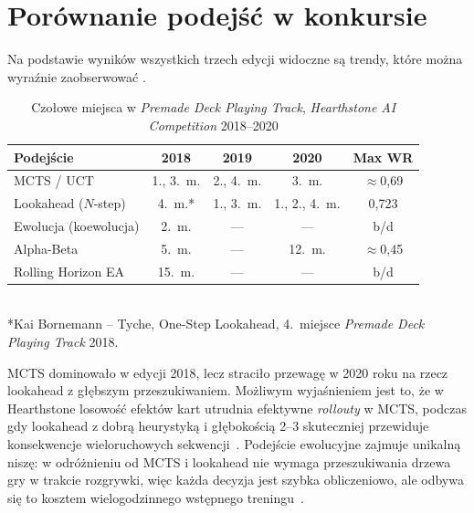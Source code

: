 \section{Porównanie podejść w konkursie}

Na podstawie wyników wszystkich trzech edycji widoczne są trendy, które można wyraźnie zaobserwować \cite{hearthstone_competition, dockhorn2019}.

\begin{table}[h!]
\centering
\caption{Czołowe miejsca w \textit{Premade Deck Playing Track}, \textit{Hearthstone AI Competition} 2018--2020}
\begin{tabular}{lcccc}
\toprule
\textbf{Podejście} & \textbf{2018} & \textbf{2019} & \textbf{2020} & \textbf{Max WR} \\
\midrule
MCTS / UCT            & 1., 3.~m. & 2., 4.~m. & 3.~m.         & $\approx$0{,}69 \\
Lookahead ($N$-step)  & 4.~m.*    & 1., 3.~m. & 1., 2., 4.~m. & 0{,}723         \\
Ewolucja (koewolucja) & 2.~m.     & ---        & ---           & b/d             \\
Alpha-Beta            & 5.~m.     & ---        & 12.~m.        & $\approx$0{,}45 \\
Rolling Horizon EA    & 15.~m.    & ---        & ---           & b/d             \\
\bottomrule
\end{tabular}
\\[4pt]
\small{*Kai Bornemann – Tyche, One-Step Lookahead, 4.~miejsce \textit{Premade Deck Playing Track} 2018.}
\end{table}

MCTS dominowało w edycji 2018, lecz straciło przewagę w 2020 roku na rzecz lookahead z głębszym przeszukiwaniem. Możliwym wyjaśnieniem jest to, że w Hearthstone losowość efektów kart utrudnia efektywne \textit{rollouty} w MCTS, podczas gdy lookahead z dobrą heurystyką i głębokością 2--3 skuteczniej przewiduje konsekwencje wieloruchowych sekwencji~\cite{dockhorn2019}. Podejście ewolucyjne zajmuje unikalną niszę: w odróżnieniu od MCTS i lookahead nie wymaga przeszukiwania drzewa gry w trakcie rozgrywki, więc każda decyzja jest szybka obliczeniowo, ale odbywa się to kosztem wielogodzinnego wstępnego treningu~\cite{sanchez2020}.